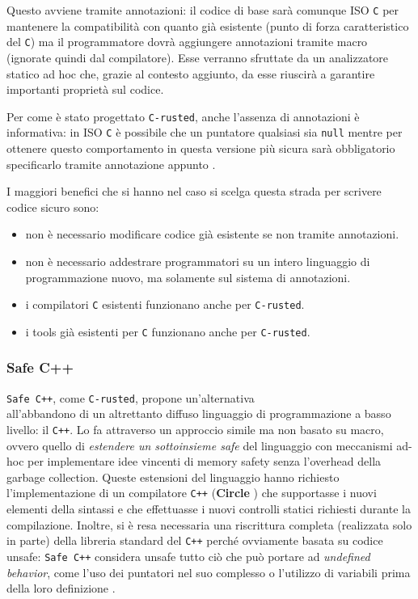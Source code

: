 Questo avviene tramite annotazioni: il codice di base sarà comunque ISO \texttt{C} per mantenere la compatibilità con quanto già esistente (punto di forza caratteristico del \texttt{C}) ma il programmatore dovrà aggiungere annotazioni tramite macro (ignorate quindi dal compilatore). Esse verranno sfruttate da un analizzatore statico ad hoc che, grazie al contesto aggiunto, da esse riuscirà a garantire importanti proprietà sul codice.

Per come è stato progettato \texttt{C-rusted}, anche l'assenza di annotazioni è informativa: in ISO \texttt{C} è possibile che un puntatore qualsiasi sia \texttt{null} mentre per ottenere questo comportamento in questa versione più sicura sarà obbligatorio specificarlo tramite annotazione appunto \cite{bagnara2023crustedadvantagesrustc}.

I maggiori benefici che si hanno nel caso si scelga questa strada per scrivere codice sicuro sono:
\begin{itemize}
    \item non è necessario modificare codice già esistente se non tramite annotazioni. 
    \item non è necessario addestrare programmatori su un intero linguaggio di programmazione nuovo, ma solamente sul sistema di annotazioni.
    \item i compilatori \texttt{C} esistenti funzionano anche per \texttt{C-rusted}.
    \item i tools già esistenti per \texttt{C} funzionano anche per \texttt{C-rusted}.
\end{itemize}


\subsubsection{Safe C++}
\texttt{Safe C++}, come \texttt{C-rusted}, propone un'alternativa \\all'abbandono di un altrettanto diffuso linguaggio di programmazione a basso livello: il \texttt{C++}. Lo fa attraverso un approccio simile ma non basato su macro, ovvero quello di \textit{estendere un sottoinsieme safe} del linguaggio con meccanismi ad-hoc per implementare idee vincenti di memory safety senza l'overhead della garbage collection. Queste estensioni del linguaggio hanno richiesto l'implementazione di un compilatore \texttt{C++} (\textbf{Circle} \cite{Circle}) che supportasse i nuovi elementi della sintassi e che effettuasse i nuovi controlli statici richiesti durante la compilazione. Inoltre, si è resa necessaria una riscrittura completa (realizzata solo in parte) della libreria standard del \texttt{C++} perché ovviamente basata su codice unsafe: \texttt{Safe C++} considera unsafe tutto ciò che può portare ad \textit{undefined behavior}, come l'uso dei puntatori nel suo complesso o l'utilizzo di variabili prima della loro definizione \cite{SAFEC++}.
